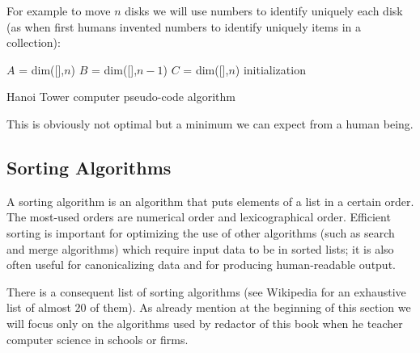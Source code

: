 	For example to move $n$ disks we will use numbers to identify uniquely each disk (as when first humans invented numbers to identify uniquely items in a collection):\\
	
	\begin{algorithm}[H]
	\small
	$A$ = dim([\space],$n$)\;
	$B$ = dim([\space],$n-1$)\;
	$C$ = dim([\space],$n$)\;
	initialization\;
	\caption{Hanoi Tower computer pseudo-code algorithm }
	\end{algorithm}
	This is obviously not optimal but a minimum we can expect from a human being. 
	
	\subsection{Sorting Algorithms}
	A sorting algorithm is an algorithm that puts elements of a list in a certain order. The most-used orders are numerical order and lexicographical order. Efficient sorting is important for optimizing the use of other algorithms (such as search and merge algorithms) which require input data to be in sorted lists; it is also often useful for canonicalizing data and for producing human-readable output. 

	There is a consequent list of sorting algorithms  (see Wikipedia for an exhaustive list of almost $20$ of them). As already mention at the beginning of this section we will focus only on the algorithms used by redactor of this book when he teacher computer science in schools or firms.

